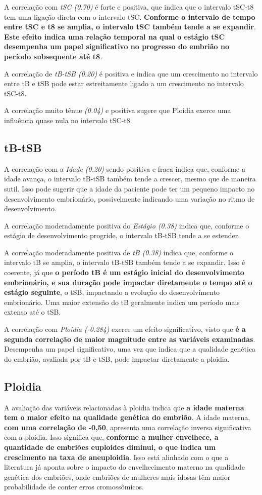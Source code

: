 A correlação com \textit{tSC (0.70)} é forte e positiva, que indica que o intervalo tSC-t8 tem uma ligação direta com o intervalo tSC. \textbf{Conforme o intervalo de tempo entre tSC e t8 se amplia, o intervalo tSC também tende a se expandir}. \textbf{Este efeito indica uma relação temporal na qual o estágio tSC desempenha um papel significativo no progresso do embrião no período subsequente até t8}.

A correlação de \textit{tB-tSB (0.20)} é positiva e indica que um crescimento no intervalo entre tB e tSB pode estar estreitamente ligado a um crescimento no intervalo tSC-t8. 

A correlação muito tênue \textit{(0.04)} e positiva sugere que Ploidia exerce uma influência quase nula no intervalo tSC-t8. 

\subsection*{tB-tSB}
A correlação com a \textit{Idade (0.20)} sendo positiva e fraca indica que, conforme a idade avança, o intervalo tB-tSB também tende a crescer, mesmo que de maneira sutil. Isso pode sugerir que a idade da paciente pode ter um pequeno impacto no desenvolvimento embrionário, possivelmente indicando uma variação no ritmo de desenvolvimento.

A correlação moderadamente positiva do \textit{Estágio (0.38)} indica que, conforme o estágio de desenvolvimento progride, o intervalo tB-tSB tende a se estender. 

A correlação moderadamente positiva de \textit{tB (0.38)} indica que, conforme o intervalo tB se amplia, o intervalo tB-tSB também tende a se expandir. Isso é coerente, já que \textbf{o período tB é um estágio inicial do desenvolvimento embrionário, e sua duração pode impactar diretamente o tempo até o estágio seguinte}, o tSB, impactando a evolução do desenvolvimento embrionário. Uma maior extensão do tB geralmente indica um período mais extenso até o tSB.

A correlação com \textit{Ploidia (-0.284)} exerce um efeito significativo, visto que \textbf{é a segunda correlação de maior magnitude entre as variáveis examinadas}. Desempenha um papel significativo, uma vez que indica que a qualidade genética do embrião, avaliada por tB e tSB, pode impactar diretamente a ploidia. 

\subsection*{Ploidia}
A avaliação das variáveis relacionadas à ploidia indica que \textbf{a idade materna tem o maior efeito na qualidade genética do embrião}. A idade materna, \textbf{com uma correlação de -0,50}, apresenta uma correlação inversa significativa com a ploidia. Isso significa que, \textbf{conforme a mulher envelhece, a quantidade de embriões euploides diminui, o que indica um crescimento na taxa de aneuploidia}. Isso está alinhado com o que a literatura já aponta sobre o impacto do envelhecimento materno na qualidade genética dos embriões, onde embriões de mulheres mais idosas têm maior probabilidade de conter erros cromossômicos. 

